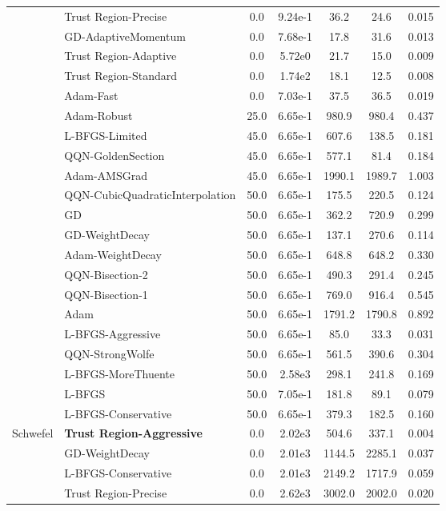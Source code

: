 \documentclass{article}
\begin{document}
\begin{table}[htbp]
{\begin{tabular}{p{2.5cm}p{2.5cm}*{5}{c}}
 & Trust Region-Precise & 0.0 & 9.24e-1 & 36.2 & 24.6 & 0.015 \\
 & GD-AdaptiveMomentum & 0.0 & 7.68e-1 & 17.8 & 31.6 & 0.013 \\
 & Trust Region-Adaptive & 0.0 & 5.72e0 & 21.7 & 15.0 & 0.009 \\
 & Trust Region-Standard & 0.0 & 1.74e2 & 18.1 & 12.5 & 0.008 \\
 & Adam-Fast & 0.0 & 7.03e-1 & 37.5 & 36.5 & 0.019 \\
 & Adam-Robust & 25.0 & 6.65e-1 & 980.9 & 980.4 & 0.437 \\
 & L-BFGS-Limited & 45.0 & 6.65e-1 & 607.6 & 138.5 & 0.181 \\
 & QQN-GoldenSection & 45.0 & 6.65e-1 & 577.1 & 81.4 & 0.184 \\
 & Adam-AMSGrad & 45.0 & 6.65e-1 & 1990.1 & 1989.7 & 1.003 \\
 & QQN-CubicQuadraticInterpolation & 50.0 & 6.65e-1 & 175.5 & 220.5 & 0.124 \\
 & GD & 50.0 & 6.65e-1 & 362.2 & 720.9 & 0.299 \\
 & GD-WeightDecay & 50.0 & 6.65e-1 & 137.1 & 270.6 & 0.114 \\
 & Adam-WeightDecay & 50.0 & 6.65e-1 & 648.8 & 648.2 & 0.330 \\
 & QQN-Bisection-2 & 50.0 & 6.65e-1 & 490.3 & 291.4 & 0.245 \\
 & QQN-Bisection-1 & 50.0 & 6.65e-1 & 769.0 & 916.4 & 0.545 \\
 & Adam & 50.0 & 6.65e-1 & 1791.2 & 1790.8 & 0.892 \\
 & L-BFGS-Aggressive & 50.0 & 6.65e-1 & 85.0 & 33.3 & 0.031 \\
 & QQN-StrongWolfe & 50.0 & 6.65e-1 & 561.5 & 390.6 & 0.304 \\
 & L-BFGS-MoreThuente & 50.0 & 2.58e3 & 298.1 & 241.8 & 0.169 \\
 & L-BFGS & 50.0 & 7.05e-1 & 181.8 & 89.1 & 0.079 \\
 & L-BFGS-Conservative & 50.0 & 6.65e-1 & 379.3 & 182.5 & 0.160 \\
\midrule
\multirow{25}{*}{Schwefel} & \textbf{Trust Region-Aggressive} & 0.0 & 2.02e3 & 504.6 & 337.1 & 0.004 \\
 & GD-WeightDecay & 0.0 & 2.01e3 & 1144.5 & 2285.1 & 0.037 \\
 & L-BFGS-Conservative & 0.0 & 2.01e3 & 2149.2 & 1717.9 & 0.059 \\
 & Trust Region-Precise & 0.0 & 2.62e3 & 3002.0 & 2002.0 & 0.020 \\

\end{tabular}}
\end{table}
\end{document}
